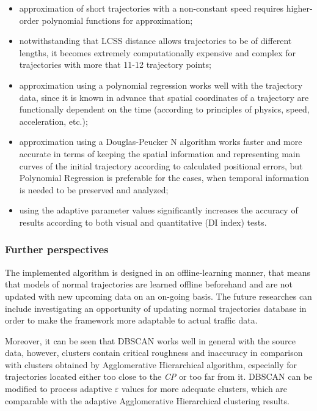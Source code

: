 \begin{itemize}
	\setlength\itemsep{0em}	
	\item approximation of short trajectories with a non-constant speed requires higher-order polynomial functions for approximation;
	\item notwithstanding that LCSS distance allows trajectories to be of different lengths, it becomes extremely computationally expensive and complex for trajectories with more that 11-12 trajectory points;
	\item approximation using a polynomial regression works well with the trajectory data, since it is known in advance that spatial coordinates of a trajectory are functionally dependent on the time (according to principles of physics, speed, acceleration, etc.);
	\item approximation using a Douglas-Peucker N algorithm works faster and more accurate in terms of keeping the spatial information and representing main curves of the initial trajectory according to calculated positional errors, but Polynomial Regression is preferable for the cases, when temporal information is needed to be preserved and analyzed;
	\item using the adaptive parameter values significantly increases the accuracy of results according to both visual and quantitative (DI index) tests.
\end{itemize}

\bigbreak

\subsubsection{Further perspectives}

The implemented algorithm is designed in an offline-learning manner, that means that models of normal trajectories are learned offline beforehand and are not updated with new upcoming data on an on-going basis. The future researches can include investigating an opportunity of updating normal trajectories database in order to make the framework more adaptable to actual traffic data.

Moreover, it can be seen that DBSCAN works well in general with the source data, however, clusters contain critical roughness and inaccuracy in comparison with clusters obtained by Agglomerative Hierarchical algorithm, especially for trajectories located either too close to the \textit{CP} or too far from it. DBSCAN can be modified to process adaptive $\varepsilon$ values for more adequate clusters, which are comparable with the adaptive Agglomerative Hierarchical clustering results.
